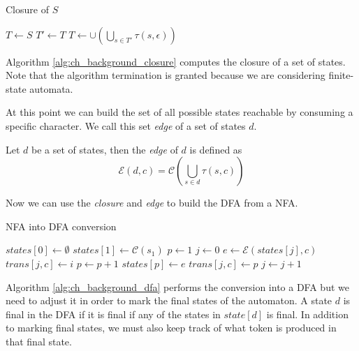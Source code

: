 \begin{algorithm}
	\caption{Closure of $S$}
	\label{alg:ch_background_closure}
	\begin{algorithmic}
		\State $T \gets S$
		\Repeat
			\State $T' \gets T$
			\State $T \gets \cup \left( \bigcup_{s \in  T'}\tau(s,\epsilon) \right)$
	\end{algorithmic}
\end{algorithm}

Algorithm \ref{alg:ch_background_closure} computes the closure of a set of states. Note that the algorithm termination is granted because we are considering finite-state automata.

At this point we can build the set of all possible states reachable by consuming a specific character. We call this set \textit{edge} of a set of states $d$. 

\begin{definition}
	Let $d$ be a set of states, then the \textit{edge} of $d$ is defined as
	\begin{equation*}
		\mathcal{E}(d,c) = \mathcal{C}\left(\bigcup_{s \in d}\tau(s,c)\right)
	\end{equation*}
\end{definition}

\noindent
Now we can use the \textit{closure} and \textit{edge} to build the DFA from a NFA.

\begin{algorithm}
	\caption{NFA into DFA conversion}
	\label{alg:ch_background_dfa}
	\begin{algorithmic}
		\State $states[0] \gets \emptyset$
		\State $states[1] \gets \mathcal{C}(s_{1})$
		\State $p \gets 1$
		\State $j \gets 0$
		\While {$j \leq p$}
			\ForAll {$c \in \Sigma$}
				\State $e \gets \mathcal{E}(states[j],c)$
				\If {$\exists \; i \leq p \; | \; e = states[i]$}
					\State $trans[j,c] \gets i$
				\Else
					\State $p \gets p + 1$
					\State $states[p] \gets e$
					\State $trans[j,c] \gets p$
				\EndIf
			\EndFor
			\State $j \gets j + 1$
		\EndWhile
	\end{algorithmic}
\end{algorithm}

\noindent
Algorithm \ref{alg:ch_background_dfa} performs the conversion into a DFA but we need to adjust it in order to mark the final states of the automaton. A state $d$ is final in the DFA if it is final if any of the states in $state[d]$ is final. In addition to marking final states, we must also keep track of what token is produced in that final state.

